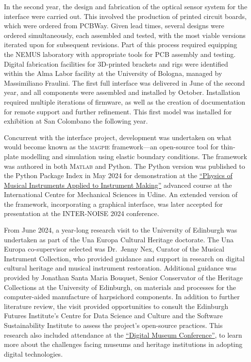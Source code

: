 In the second year, the design and fabrication of the optical sensor system for the interface were carried out. This involved the production of printed circuit boards, which were ordered from PCBWay. Given lead times, several designs were ordered simultaneously, each assembled and tested, with the most viable versions iterated upon for subsequent revisions. Part of this process required equipping the NEMUS laboratory with appropriate tools for PCB assembly and testing. Digital fabrication facilities for 3D-printed brackets and rigs were identified within the Alma Labor facility at the University of Bologna, managed by Massimiliano Fraulini. The first full interface was delivered in June of the second year, and all components were assembled and installed by October. Installation required multiple iterations of firmware, as well as the creation of documentation for remote support and further refinement. This first model was installed for exhibition at San Colombano the following year.

Concurrent with the interface project, development was undertaken on what would become known as the \textsc{magpie} framework—an open-source tool for thin-plate modelling and simulation using elastic boundary conditions. The framework was authored in both M\textsc{atlab} and Python. The Python version was published to the Python Package Index in May 2024 for demonstration at the \href{https://cism.it/en/activities/courses/C2404/}{``Physics of Musical Instruments Applied to Instrument Making''} advanced course at the International Centre for Mechanical Sciences in Udine. An extended version of the framework, incorporating a graphical interface, was later accepted for presentation at the INTER-NOISE 2024 conference.

From June 2024, a year-long research visit to the University of Edinburgh was undertaken as part of the Una Europa Cultural Heritage doctorate. The Una Europa co-supervisor selected was Dr.\ Jenny Nex, Curator of the Musical Instrument Collection, who provided guidance and support in research on digital cultural heritage and musical instrument restoration. Additional guidance was provided by Jonathan Santa Maria Bouquet, Senior Conservator of the Heritage Collections at the University of Edinburgh, on materials and processes for the computer-aided manufacture of harpsichord components. In addition to further literature review, the visit provided opportunities to consult the Edinburgh Futures Institute's Centre for Data Science and Culture and the Software Sustainability Institute to assess the project’s open-source practices. This research also included attendance at the \href{https://www.eventbrite.co.uk/e/the-digital-museum-conference-tickets-995019448957?aff=eemailordconf&utm_campaign=order_confirm&ref=eemailordconf&utm_medium=email&utm_source=eventbrite&utm_term=viewevent}{``Digital Museum Conference''}, to learn more about the challenges facing museums and heritage institutions in adopting digital technologies.

